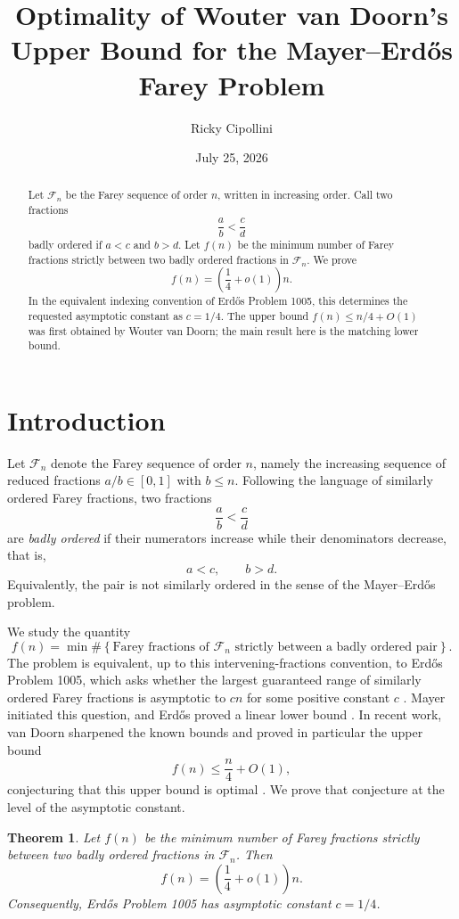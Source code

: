 \documentclass[11pt]{article}
\title{Optimality of Wouter van Doorn's Upper Bound for the Mayer--Erdős Farey Problem}
\author{Ricky Cipollini}
\date{July 25, 2026}
\numberwithin{equation}{section}
\newtheorem{theorem}{Theorem}
\theoremstyle{definition}
\theoremstyle{remark}
\newcommand{\Fn}{\mathcal F_n}
\newcommand{\1}{\mathbf 1}
\begin{document}
\maketitle

\begin{abstract}
Let $\Fn$ be the Farey sequence of order $n$, written in increasing order.  Call two fractions
\[
  \frac ab<\frac cd
\]
badly ordered if $a<c$ and $b>d$.  Let $f(n)$ be the minimum number of Farey fractions strictly between two badly ordered fractions in $\Fn$.  We prove
\[
  f(n)=\left(\frac14+o(1)\right)n.
\]
In the equivalent indexing convention of Erdős Problem 1005, this determines the requested asymptotic constant as $c=1/4$.  The upper bound $f(n)\le n/4+O(1)$ was first obtained by Wouter van Doorn; the main result here is the matching lower bound.
\end{abstract}

\section{Introduction}

Let $\Fn$ denote the Farey sequence of order $n$, namely the increasing sequence of reduced fractions $a/b\in[0,1]$ with $b\le n$.  Following the language of similarly ordered Farey fractions, two fractions
\[
  \frac ab<\frac cd
\]
are \emph{badly ordered} if their numerators increase while their denominators decrease, that is,
\[
  a<c,\qquad b>d.
\]
Equivalently, the pair is not similarly ordered in the sense of the Mayer--Erdős problem.

We study the quantity
\[
  f(n)=\min\#\left\{\text{Farey fractions of }\Fn\text{ strictly between a badly ordered pair}\right\}.
\]
The problem is equivalent, up to this intervening-fractions convention, to Erdős Problem 1005, which asks whether the largest guaranteed range of similarly ordered Farey fractions is asymptotic to $cn$ for some positive constant $c$ \cite{ErdosProblem1005}.  Mayer initiated this question, and Erdős proved a linear lower bound \cite{Mayer1942,Erdos1943}.  In recent work, van Doorn sharpened the known bounds and proved in particular the upper bound
\[
  f(n)\le \frac n4+O(1),
\]
conjecturing that this upper bound is optimal \cite{vanDoorn2025}.  We prove that conjecture at the level of the asymptotic constant.

\begin{theorem}\label{thm:main}
Let $f(n)$ be the minimum number of Farey fractions strictly between two badly ordered fractions in $\Fn$.  Then
\[
  f(n)=\left(\frac14+o(1)\right)n.
\]
Consequently, Erdős Problem 1005 has asymptotic constant $c=1/4$.
\end{theorem}
\end{document}
